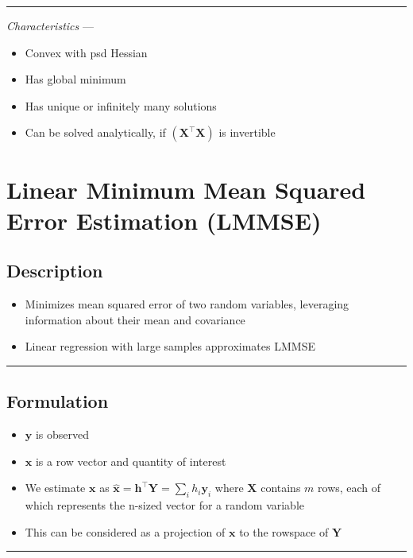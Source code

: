 {\color{lightgray}\hrule height 0.001mm}

\emph{Characteristics} --- 
\begin{itemize}
    \item Convex with psd Hessian
    \item Has global minimum
    \item Has unique or infinitely many solutions
    \item Can be solved analytically, if $(\boldsymbol{X}^\intercal \boldsymbol{X})$ is invertible
\end{itemize}

\section{Linear Minimum Mean Squared Error Estimation (LMMSE)}
\subsection*{Description}
\begin{itemize}
    \item Minimizes mean squared error of two random variables, leveraging information about their mean and covariance 
    \item Linear regression with large samples approximates LMMSE 
\end{itemize}

{\color{black}\hrule height 0.001mm}

\subsection*{Formulation}

\begin{itemize}
    \item $\boldsymbol{y}$ is observed
    \item $\boldsymbol{x}$ is a row vector and quantity of interest
    \item We estimate $\boldsymbol{x}$ as $\hat{\boldsymbol{x}} = \boldsymbol{h}^\intercal \boldsymbol{Y} = \sum_i h_i \boldsymbol{y}_i$ where $\boldsymbol{X}$ contains $m$ rows, each of which represents the n-sized vector for a random variable
    \item This can be considered as a projection of $\boldsymbol{x}$ to the rowspace of $\boldsymbol{Y}$
\end{itemize}

{\color{black}\hrule height 0.001mm}

